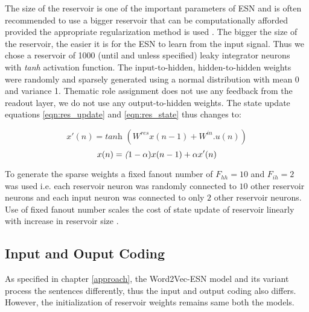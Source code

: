 The size of the reservoir is one of the important parameters of ESN and is often recommended to use a bigger reservoir that can be computationally afforded provided the appropriate regularization method is used \cite{esn:practical_guide}. The bigger the size of the reservoir, the easier it is for the ESN to learn from the input signal. Thus we chose a reservoir of 1000 (until and unless specified) leaky integrator neurons with \textit{tanh} activation function. The input-to-hidden, hidden-to-hidden weights were randomly and sparsely generated using a normal distribution with mean 0 and variance 1. Thematic role assignment does not use any feedback from the readout layer, we do not use any output-to-hidden weights. The state update equations \ref{eqn:res_update} and \ref{eqn:res_state} thus changes to:

\begin{equation} \label{eqn:res_new_update}
x'(n) =\textit {tanh } ( W^{res}x(n-1) + W^{in}.u(n))
\end{equation}
\begin{equation} \label{eqn:res_new_state}
x(n) =\textit (1-\alpha) x(n-1) + \alpha x'(n)
\end{equation}

To generate the sparse weights a fixed fanout number of $F_{hh} = 10$ and $F_{ih} = 2$ was used i.e. each reservoir neuron was randomly connected to $10$ other reservoir neurons and each input neuron was connected to only $2$ other reservoir neurons. Use of fixed fanout number scales the cost of state update of reservoir linearly with increase in reservoir size \cite{esn:practical_guide}.

\subsection{Input and Ouput Coding}

As specified in chapter \ref{approach}, the Word2Vec-ESN model and its variant process the sentences differently, thus the input and output coding also differs. However, the initialization of reservoir weights remains same both the models. 

